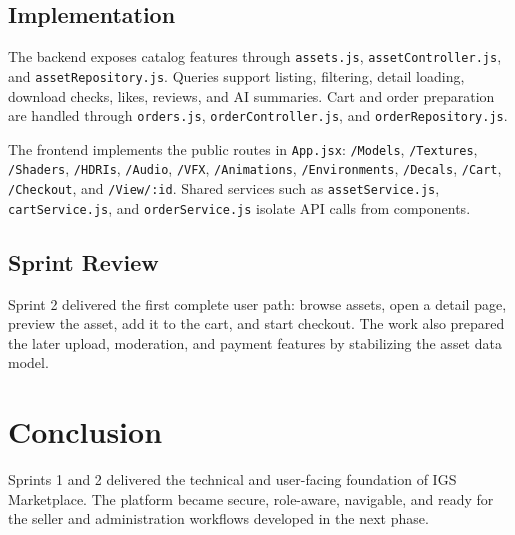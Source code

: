 \subsection{Implementation}

The backend exposes catalog features through \texttt{assets.js}, \texttt{assetController.js},
and \texttt{assetRepository.js}. Queries support listing, filtering, detail loading, download
checks, likes, reviews, and AI summaries. Cart and order preparation are handled through
\texttt{orders.js}, \texttt{orderController.js}, and \texttt{orderRepository.js}.

The frontend implements the public routes in \texttt{App.jsx}: \texttt{/Models},
\texttt{/Textures}, \texttt{/Shaders}, \texttt{/HDRIs}, \texttt{/Audio}, \texttt{/VFX},
\texttt{/Animations}, \texttt{/Environments}, \texttt{/Decals}, \texttt{/Cart},
\texttt{/Checkout}, and \texttt{/View/:id}. Shared services such as \texttt{assetService.js},
\texttt{cartService.js}, and \texttt{orderService.js} isolate API calls from components.

\subsection{Sprint Review}

Sprint 2 delivered the first complete user path: browse assets, open a detail page, preview
the asset, add it to the cart, and start checkout. The work also prepared the later upload,
moderation, and payment features by stabilizing the asset data model.

\section*{Conclusion}
Sprints 1 and 2 delivered the technical and user-facing foundation of IGS Marketplace. The
platform became secure, role-aware, navigable, and ready for the seller and administration
workflows developed in the next phase.
